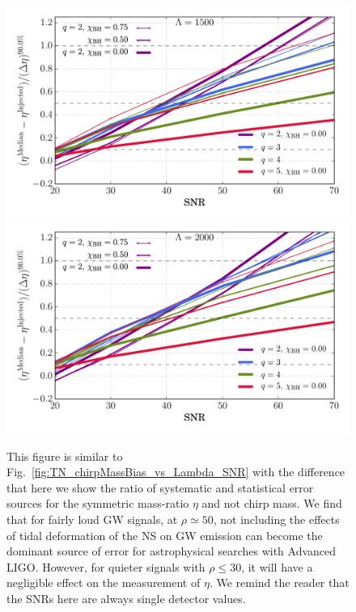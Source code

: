 \documentclass[aps,prd,amsmath,floats,floatfix, twocolumn,
superscriptaddress,nofootinbib,showpacs]{revtex4-1}
\begin{document}
\begin{figure}[!t]
\includegraphics[width=0.8\columnwidth]{plots/TNEtaBiasesOverCIWidthsVsSNR_Lambda1500_CI90_0}
\includegraphics[width=0.8\columnwidth]{plots/TNEtaBiasesOverCIWidthsVsSNR_Lambda2000_CI90_0}
\caption{This figure is similar to Fig.~\ref{fig:TN_chirpMassBias_vs_Lambda_SNR}
with the difference that here we show the ratio of systematic and statistical
error sources for the symmetric mass-ratio $\eta$ and not chirp mass. We find
that for fairly loud GW signals, at $\rho\simeq 50$, not including the
effects of tidal deformation of the NS on GW emission can become the dominant
source of error for astrophysical searches with Advanced LIGO. However, for
quieter signals with $\rho\leq 30$, it will have a negligible effect on the
measurement of $\eta$. We remind the reader that the SNRs here are always
single detector values.
}
\label{fig:TN_EtaBias_vs_Lambda_SNR}
\end{figure}
% 
% 
\end{document}
